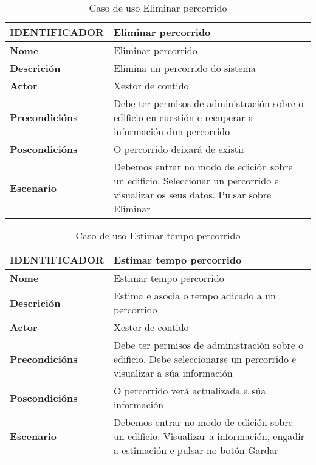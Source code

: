 \begin{table}[tbp]
	\begin{tabular}{|l|p{10cm}|}
		\hline 
		\textbf{IDENTIFICADOR}	& \textbf{Eliminar percorrido} \\ 
		\hline 
		\textbf{Nome} & Eliminar percorrido \\ 
		\hline 
		\textbf{Descrición} & Elimina un percorrido do sistema \\ 
		\hline 
		\textbf{Actor} & Xestor de contido \\ 
		\hline 
		\textbf{Precondicións} & Debe ter permisos de administración sobre o edificio en cuestión e recuperar a información dun percorrido \\ 
		\hline 
		\textbf{Poscondicións} & O percorrido deixará de existir \\ 
		\hline 
		\textbf{Escenario} & Debemos entrar no modo de edición sobre un edificio. Seleccionar un percorrido e visualizar os seus datos. Pulsar sobre Eliminar \\ 
		\hline 
	\end{tabular}
	\caption{Caso de uso Eliminar percorrido}
	\label{tab:cuEliminarPercorrido}
\end{table}

\begin{table}[tbp]
	\begin{tabular}{|l|p{10cm}|}
		\hline 
		\textbf{IDENTIFICADOR}	& \textbf{Estimar tempo percorrido} \\ 
		\hline 
		\textbf{Nome} & Estimar tempo percorrido \\ 
		\hline 
		\textbf{Descrición} & Estima e asocia o tempo adicado a un percorrido \\ 
		\hline 
		\textbf{Actor} & Xestor de contido \\ 
		\hline 
		\textbf{Precondicións} & Debe ter permisos de administración sobre o edificio. Debe seleccionarse un percorrido e visualizar a súa información \\ 
		\hline 
		\textbf{Poscondicións} & O percorrido verá actualizada a súa información \\ 
		\hline 
		\textbf{Escenario} & Debemos entrar no modo de edición sobre un edificio. Visualizar a información, engadir a estimación e pulsar no botón Gardar \\ 
		\hline 
	\end{tabular}
	\caption{Caso de uso Estimar tempo percorrido}
	\label{tab:cuEstimarTempoPercorrido}
\end{table}

